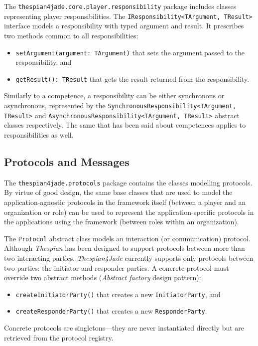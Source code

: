 The \texttt{thespian4jade.core.player.responsibility} package includes classes representing player responsibilities.
The \texttt{IResponsibility<TArgument, TResult>} interface models a responsibility with typed argument and result.
It prescribes two methods common to all responsibilities:
\begin{itemize}
	\item \texttt{setArgument(argument: TArgument)} that sets the argument passed to the responsibility, and
	\item \texttt{getResult(): TResult} that gets the result returned from the responsibility.
\end{itemize}

Similarly to a competence, a responsibility can be either synchronous or asynchronous, represented by the \texttt{SynchronousResponsibility<TArgument, TResult>} and \texttt{AsynchronousResponsibility<TArgument, TResult>} abstract classes respectively.
The same that has been said about competences applies to responsibilities as well.

\subsection{Protocols and Messages}

The \texttt{thespian4jade.protocols} package contains the classes modelling protocols.
By virtue of good design, the same base classes that are used to model the application-agnostic protocols in the framework itself (between a player and an organization or role) can be used to represent the application-specific protocols in the applications using the framework (between roles within an organization). 

The \texttt{Protocol} abstract class models an interaction (or communication) protocol.
Although \textit{Thespian} has been designed to support protocols between more than two interacting parties, \textit{Thespian4Jade} currently supports only protocols between two parties: the initiator and responder parties.
A concrete protocol must override two abstract methods (\textit{Abstract factory} design pattern):
\begin{itemize}
	\item \texttt{createInitiatorParty()} that creates a new \texttt{InitiatorParty}, and
	\item \texttt{createResponderParty()} that creates a new \texttt{ResponderParty}.
\end{itemize}
Concrete protocols are singletons---they are never instantiated directly but are retrieved from the protocol registry.

